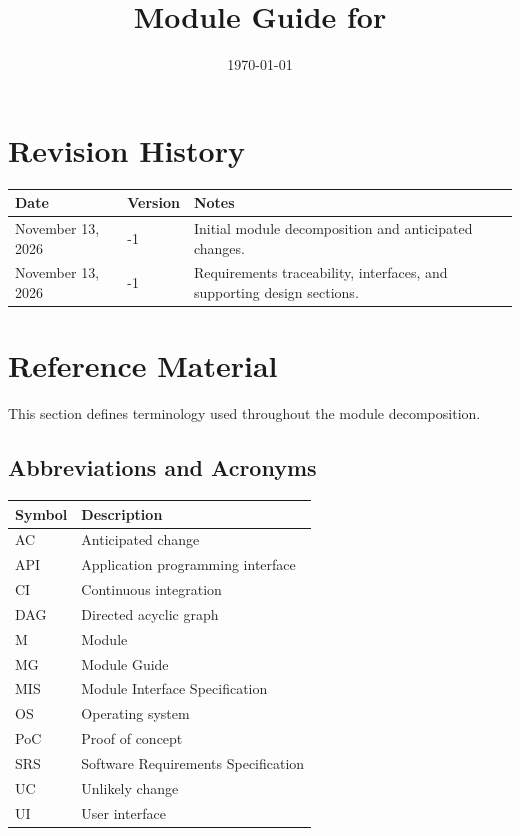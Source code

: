 \documentclass[12pt, titlepage]{article}
\begin{document}
\title{Module Guide for \progname{}} 
\author{\authname}
\date{\today}

\maketitle


\section{Revision History}

\begin{tabularx}{\textwidth}{p{3cm}p{2cm}X}
\toprule {\bf Date} & {\bf Version} & {\bf Notes}\\
\midrule
November 13, 2026 & -1 & Initial module decomposition and anticipated changes.\\
November 13, 2026 & -1 & Requirements traceability, interfaces, and supporting design sections.\\
\bottomrule
\end{tabularx}

\newpage

\section{Reference Material}

This section defines terminology used throughout the module decomposition.

\subsection{Abbreviations and Acronyms}
\renewcommand{\arraystretch}{1.2}
\begin{tabularx}{\textwidth}{@{}lX@{}}
\toprule
\textbf{Symbol} & \textbf{Description}\\
\midrule
AC & Anticipated change\\
API & Application programming interface\\
CI & Continuous integration\\
DAG & Directed acyclic graph\\
M & Module\\
MG & Module Guide\\
MIS & Module Interface Specification\\
OS & Operating system\\
PoC & Proof of concept\\
SRS & Software Requirements Specification\\
UC & Unlikely change\\
UI & User interface\\
\bottomrule
\end{tabularx}
\end{document}
